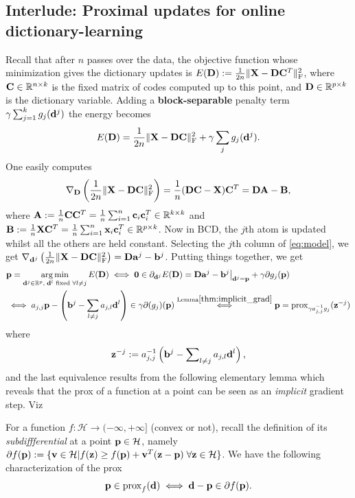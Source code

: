 \subsection{Interlude: Proximal updates for online dictionary-learning}
Recall that after $n$ passes over the data, the objective function whose minimization gives the dictionary updates is $E(\mathbf{D}) := \frac{1}{2n}\|\mathbf{X} - \mathbf{D}\mathbf{C}^T\|_{\text{F}}^2$, where $\mathbf{C} \in \mathbb R^{n \times k}$ is the fixed matrix of codes computed up to this point, and $\mathbf{D} \in \mathbb R^{p \times k}$ is the dictionary variable. Adding a \textbf{block-separable} penalty term $\gamma\sum_{j=1}^kg_j(\mathbf{d}^j)$ the energy becomes
\begin{equation}
  E(\mathbf{D}) = \frac{1}{2n}\|\mathbf{X} - \mathbf{D}\mathbf{C}\|_{\text{F}}^2 + \gamma \sum_{j} g_j(\mathbf{d}^j).
  \label{eq:model}
\end{equation}
One easily computes
$$\nabla_{\mathbf{D}}\left(\frac{1}{2n}\|\mathbf{X} - \mathbf{D}\mathbf{C}\|_{\text{F}}^2\right) = \frac{1}{n}(\mathbf{DC} - \mathbf{X})\mathbf{C}^T = \mathbf{DA} - \mathbf{B},$$
where $ \mathbf{A} := \frac{1}{n}\mathbf{C}\mathbf{C}^T = \frac{1}{n}\sum_{i=1}^n\mathbf{c}_i\mathbf{c}_i^T \in \mathbb R^{k \times k}$ and $\mathbf{B} := \frac{1}{n}\mathbf{X}\mathbf{C}^T = \frac{1}{n}\sum_{i=1}^n\mathbf{x}_i\mathbf{c}_i^T \in \mathbb R^{p \times k}$. 
Now in BCD, the $j$th atom is updated whilst all the others are held constant. 
Selecting the $j$th column of \eqref{eq:model}, we get
$\nabla_{\mathbf{d}^j}\left(\frac{1}{2n}\|\mathbf{X} - \mathbf{D}\mathbf{C}\|_{\text{F}}^2\right) = \mathbf{D}\mathbf{a}^j - \mathbf{b}^j$. Putting things together, we get
\begin{eqnarray*}
  \begin{split}
    &\mathbf{p} = \operatorname*{arg\,min}_{\mathbf{d}^j \in \mathbb R^p,\;\mathbf{d}^l\text{ fixed }\forall l \ne j}E(\mathbf{D}) \iff
    \mathbf{0} \in \partial_{\mathbf{d}^j}E(\mathbf{D}) = \mathbf{D}\mathbf{a}^j-\mathbf{b}^j\big|_{\mathbf{d}^j = \mathbf{p}} + \gamma \partial g_j(\mathbf{p})\\
    &\iff a_{j,j}\mathbf{p} - \left(\mathbf{b}^j-\sum_{l \ne j}a_{j,l}\mathbf{d}^l\right) \in \gamma \partial (g_j)(\mathbf{p})
    \overset{\text{Lemma} \ref{thm:implicit_grad}}{\iff} \mathbf{p} = \operatorname{prox}_{\gamma a_{j,j}^{-1}g_j}(\mathbf{z}^{-j})
\end{split}
\end{eqnarray*}
where
\[
  \mathbf{z}^{-j} := a_{j,j}^{-1}\left(\mathbf{b}^j-\sum\nolimits_{l \ne j}a_{j,l}\mathbf{d}^l\right),
\]
and the last equivalence results from the following elementary lemma which reveals that the prox of a function at a point can be seen as an \textit{implicit} gradient step. Viz
\begin{lemma}
  For a function $f: \mathcal H \rightarrow (-\infty,+\infty]$ (convex or not), recall the definition of its \textit{subdiffferential} at a point $\mathbf{p} \in \mathcal H$, namely  $\partial f(\mathbf{p}) := \{\mathbf{v} \in \mathcal H | f(\mathbf{z}) \ge f(\mathbf{p}) + \mathbf{v}^T(\mathbf{z} - \mathbf{p})\; \forall \mathbf{z} \in \mathcal H\}$. We have the following characterization of the prox
  \begin{equation}
    \mathbf{p} \in \operatorname{prox}_{f}(\mathbf{d}) \iff \mathbf{d}-\mathbf{p} \in \partial f(\mathbf{p}).
\end{equation}

  \label{thm:implicit_grad}
\end{lemma}

